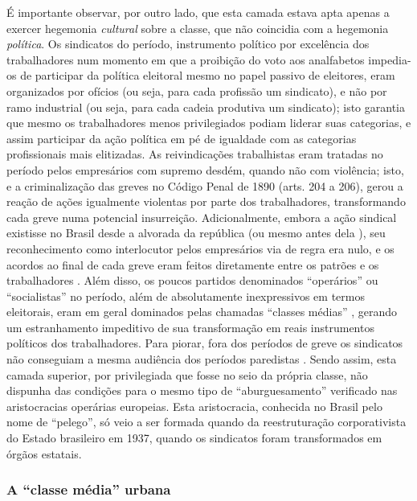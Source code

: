 É importante observar, por outro lado, que esta camada estava apta apenas a exercer hegemonia \textit{cultural} sobre a classe, que não coincidia com a hegemonia \textit{política}. Os sindicatos do período, instrumento político por excelência dos trabalhadores num momento em que a proibição do voto aos analfabetos impedia-os de participar da política eleitoral mesmo no papel passivo de eleitores, eram organizados por ofícios (ou seja, para cada profissão um sindicato), e não por ramo industrial (ou seja, para cada cadeia produtiva um sindicato); isto garantia que mesmo os trabalhadores menos privilegiados podiam liderar suas categorias, e assim participar da ação política em pé de igualdade com as categorias profissionais mais elitizadas. As reivindicações trabalhistas eram tratadas no período pelos empresários com supremo desdém, quando não com violência; isto, e a criminalização das greves no Código Penal de 1890 (arts. 204 a 206), gerou a reação de ações igualmente violentas por parte dos trabalhadores, transformando cada greve numa potencial insurreição. Adicionalmente, embora a ação sindical existisse no Brasil desde a alvorada da república (ou mesmo antes dela \cite[p.~69-77]{koval_prolbras_1982}), seu reconhecimento como interlocutor pelos empresários via de regra era nulo, e os acordos ao final de cada greve eram feitos diretamente entre os patrões e os trabalhadores \cite{dulles_anacombras_1977,koval_prolbras_1982}. Além disso, os poucos partidos denominados ``operários'' ou ``socialistas'' no período, além de absolutamente inexpressivos em termos eleitorais, eram em geral dominados pelas chamadas ``classes médias'' \cite[p.~150]{pinheiro_prolind_1977}, gerando um estranhamento impeditivo de sua transformação em reais instrumentos políticos dos trabalhadores. Para piorar, fora dos períodos de greve os sindicatos não conseguiam a mesma audiência dos períodos paredistas \cite[p.~152]{pinheiro_prolind_1977}. Sendo assim, esta camada superior, por privilegiada que fosse no seio da própria classe, não dispunha das condições para o mesmo tipo de ``aburguesamento'' verificado nas aristocracias operárias europeias. Esta aristocracia, conhecida no Brasil pelo nome de ``pelego'', só veio a ser formada quando da reestruturação corporativista do Estado brasileiro em 1937, quando os sindicatos foram transformados em órgãos estatais.

\subsubsection{A ``classe média'' urbana}\label{subsubsec:clamed}

